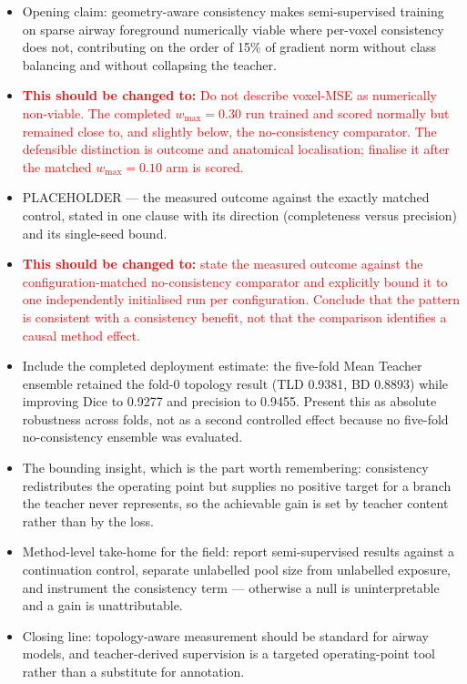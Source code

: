 \begin{itemize}
  \item Opening claim: geometry-aware consistency makes semi-supervised training on sparse
  airway foreground numerically viable where per-voxel consistency does not, contributing on
  the order of 15\% of gradient norm without class balancing and without collapsing the
  teacher.
  \item[] \textcolor{red}{\textbf{This should be changed to:} Do not describe voxel-MSE as
  numerically non-viable. The completed $w_{\max}=0.30$ run trained and scored normally but
  remained close to, and slightly below, the no-consistency comparator. The defensible distinction
  is outcome and anatomical localisation; finalise it after the matched $w_{\max}=0.10$ arm is
  scored.}
  \item PLACEHOLDER --- the measured outcome against the exactly matched control, stated in
  one clause with its direction (completeness versus precision) and its single-seed bound.
  \item[] \textcolor{red}{\textbf{This should be changed to:} state the measured outcome
  against the configuration-matched no-consistency comparator and explicitly bound it to one
  independently initialised run per configuration. Conclude that the pattern is consistent
  with a consistency benefit, not that the comparison identifies a causal method effect.}
  \item Include the completed deployment estimate: the five-fold Mean Teacher ensemble
  retained the fold-0 topology result (TLD 0.9381, BD 0.8893) while improving Dice to 0.9277 and
  precision to 0.9455. Present this as absolute robustness across folds, not as a second controlled
  effect because no five-fold no-consistency ensemble was evaluated.
  \item The bounding insight, which is the part worth remembering: consistency redistributes
  the operating point but supplies no positive target for a branch the teacher never
  represents, so the achievable gain is set by teacher content rather than by the loss.
  \item Method-level take-home for the field: report semi-supervised results against a
  continuation control, separate unlabelled pool size from unlabelled exposure, and instrument
  the consistency term --- otherwise a null is uninterpretable and a gain is unattributable.
  \item Closing line: topology-aware measurement should be standard for airway models, and
  teacher-derived supervision is a targeted operating-point tool rather than a substitute for
  annotation.
\end{itemize}
